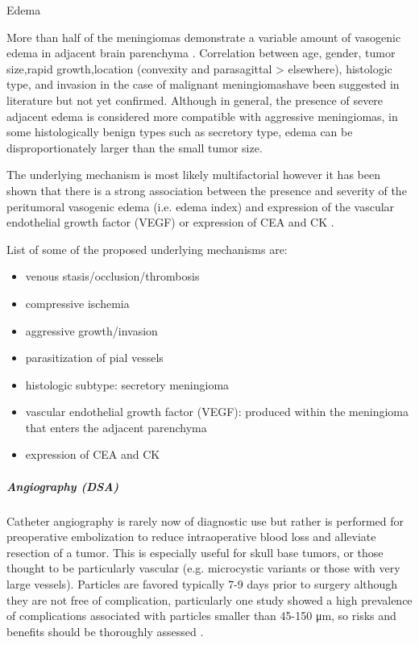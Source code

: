 Edema

More than half of the meningiomas demonstrate a variable amount of vasogenic edema in adjacent brain parenchyma . Correlation between age, gender, tumor size,rapid growth,location (convexity and parasagittal \textgreater{} elsewhere), histologic type, and invasion in the case of malignant meningiomashave been suggested in literature but not yet confirmed. Although in general, the presence of severe adjacent edema is considered more compatible with aggressive meningiomas, in some histologically benign types such as secretory type, edema can be disproportionately larger than the small tumor size.

The underlying mechanism is most likely multifactorial however it has been shown that there is a strong association between the presence and severity of the peritumoral vasogenic edema (i.e. edema index) and expression of the vascular endothelial growth factor (VEGF) or expression of CEA and CK .

List of some of the proposed underlying mechanisms are:

\begin{itemize}
	\item
	venous stasis/occlusion/thrombosis
	\item
	compressive ischemia
	\item
	aggressive growth/invasion
	\item
	parasitization of pial vessels
	\item
	histologic subtype: secretory meningioma
	\item
	vascular endothelial growth factor (VEGF): produced within the meningioma that enters the adjacent parenchyma
	\item
	expression of CEA and CK
\end{itemize}


\subparagraph{Angiography (DSA)}

Catheter angiography is rarely now of diagnostic use but rather is performed for preoperative embolization to reduce intraoperative blood loss and alleviate resection of a tumor. This is especially useful for skull base tumors, or those thought to be particularly vascular (e.g. microcystic variants or those with very large vessels). Particles are favored typically 7-9 days prior to surgery although they are not free of complication, particularly one study showed a high prevalence of complications associated with particles smaller than 45-150 μm, so risks and benefits should be thoroughly assessed .

